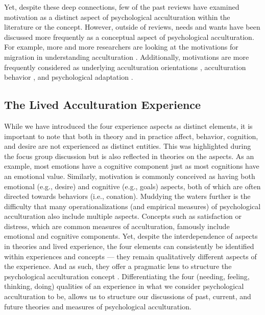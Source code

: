 \documentclass[man, 12pt, a4paper, mask]{apa7}
\begin{document}
Yet, despite these deep connections, few of the past reviews have examined motivation as a distinct aspect of psychological acculturation within the literature or the concept. However, outside of reviews, needs and wants have been discussed more frequently as a conceptual aspect of psychological acculturation. For example, more and more researchers are looking at the motivations for migration in understanding acculturation \citep{Sandu2018, Echterhoff2020}. Additionally, motivations are more frequently considered as underlying  acculturation orientations \citep{Recker2017a}, acculturation behavior \citep{Reece2000}, and psychological adaptation \citep{Safdar2003}. 

\subsection{The Lived Acculturation Experience}
While we have introduced the four experience aspects as distinct elements, it is important to note that both in theory and in practice affect, behavior, cognition, and desire are not experienced as distinct entities. This was highlighted during the focus group discussion but is also reflected in theories on the aspects. As an example, most emotions have a cognitive component just as most cognitions have an emotional value. Similarly, motivation is commonly conceived as having both emotional (e.g., desire) and cognitive (e.g., goals) aspects, both of which are often directed towards behaviors (i.e., conation). Muddying the waters further is the difficulty that many operationalizations (and empirical measures) of psychological acculturation also include multiple aspects. Concepts such as satisfaction or distress, which are common measures of acculturation, famously include emotional and cognitive components.  Yet, despite the interdependence of aspects in theories and lived experience, the four elements can consistently be identified within experiences and concepts --- they remain qualitatively different aspects of the experience. And as such, they offer a pragmatic lens to structure the psychological acculturation concept \citep{Kuhn1962}. Differentiating the four (needing, feeling, thinking, doing) qualities of an experience in what we consider psychological acculturation to be, allows us to structure our discussions of past, current, and future theories and measures of psychological acculturation.
\end{document}

